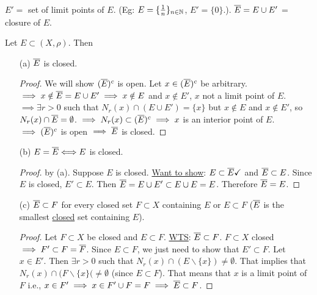 \documentclass[]{article}
\begin{document}
\begin{recall}
	$E' = $ set of limit points of $E$. (Eg: $E = \{\frac{1}{n}\}_{n\in\mathbb{N}}$, $E' = \{0\}$.). $\overline{E} = E\cup E'$ = closure of $E$.
\end{recall}
\begin{theorem}
	Let $E\subset(X,\rho)$. Then
	\begin{enumerate}
		\item[(a)] $\overline{E}$ is closed.
			\begin{proof}
				We will show $(\overline{E})^c$ is open. Let $x\in (\overline{E})^c$ be arbitrary. $\implies x\notin \overline{E} = E\cup E' \implies x\notin E$ and $x\notin E'$, $x$ not a limit point of $E$.
				$\implies \exists r>0$ such that $N_r(x)\cap (E\cup E') = \{x\}$ but $x\notin E$ and $x\notin E'$, so $N_r(x)\cap \overline{E} = \emptyset$.
				$\implies N_r(x)\subset (\overline{E})^c \implies x$ is an interior point of $E$. $\implies (\overline{E})^c$ is open $\implies \overline{E}$ is closed.
			\end{proof}
		\item[(b)] $E = \overline{E} \Longleftrightarrow E$ is closed.
			\begin{proof}
				\say{$\implies$} by (a).
				\say{$\Lla$} Suppose $E$ is closed.
				\ul{Want to show}: $E\subset \overline{E}\checkmark$ and $\overline{E}\subset E$.
				Since $E$ is closed, $E'\subset E$. Then $\overline{E} = E\cup E'\subset E\cup E = E$. Therefore $\overline{E} = E$.
			\end{proof}
		\item[(c)] $\overline{E}\subset F$ for every closed set $F\subset X$ containing $E$ or $E\subset F$ ($\overline{E}$ is the smallest \ul{closed} set containing $E$).
			\begin{proof}
				Let $F\subset X$ be closed and $E\subset F$.
				\ul{WTS}: $\overline{E} \subset F$.
				$F\subset X$ closed $\implies F'\subset F = \overline{F}$. Since $E\subset F$, we just need to show that $E'\subset F$.
				Let $x\in E'$. Then $\exists r>0$ such that $N_r(x)\cap (E\backslash\{x\})\neq \emptyset$.
				That implies that $N_r(x)\cap(F\backslash\{x\}(\neq \emptyset$ (since $E\subset F$).
				That means that $x$ is a limit point of $F$ i.e., $x\in F' \implies x\in F'\cup F = F \implies \overline{E} \subset F$.
			\end{proof}
	\end{enumerate}
\end{theorem}
\end{document}
